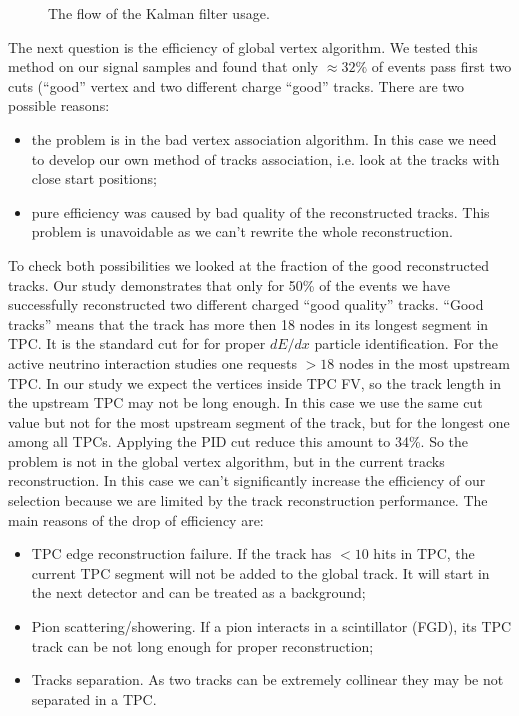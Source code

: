 \documentclass[../main.tex]{subfiles}
\begin{document}
\begin{figure}[!ht]
  \caption{The flow of the Kalman filter usage.}
  \label{fig:HNL:kalman}
\end{figure}

The next question is the efficiency of global vertex algorithm. We tested this method on our signal samples and found that only $\approx32\%$ of events pass first two cuts (``good'' vertex and two different charge ``good'' tracks. There are two possible reasons:
\begin{itemize}
  \item the problem is in the bad vertex association algorithm. In this case we need to develop our own method of tracks association, i.e. look at the tracks with close start positions;
  \item  pure efficiency was caused by bad quality of the reconstructed tracks. This problem is unavoidable as we can't rewrite the whole reconstruction.
\end{itemize}

To check both possibilities we looked at the fraction of the good reconstructed tracks. Our study demonstrates that only for 50\% of the events we have successfully reconstructed two different charged ``good quality'' tracks. ``Good tracks'' means that the track has more then 18 nodes in its longest segment in TPC. It is the standard cut for for proper $dE/dx$ particle identification. For the active neutrino interaction studies one requests $>18$ nodes in the most upstream TPC. In our study we expect the vertices inside TPC FV, so the track length in the upstream TPC may not be long enough. In this case we use the same cut value but not for the most upstream segment of the track, but for the longest one among all TPCs. Applying the PID cut reduce this amount to 34\%. So the problem is not in the global vertex algorithm, but in the current tracks reconstruction. In this case we can't significantly increase the efficiency of our selection because we are limited by the track reconstruction performance. The main reasons of the drop of efficiency are:
\begin{itemize}
  \item TPC edge reconstruction failure. If the track has $<10$ hits in TPC, the current TPC segment will not be added to the global track. It will start in the next detector and can be treated as a background;
  \item Pion scattering/showering. If a pion interacts in a scintillator (FGD), its TPC track can be not long enough for proper reconstruction;
  \item Tracks separation. As two tracks can be extremely collinear they may be not separated in a TPC.
\end{itemize}
\end{document}
